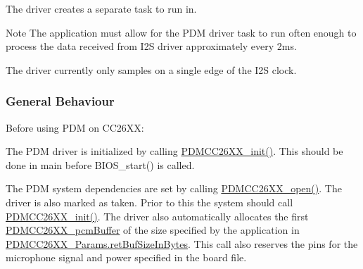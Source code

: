 The driver creates a separate task to run in.

\begin{DoxyNote}{Note}
The application must allow for the P\+D\+M driver task to run often enough to process the data received from I2\+S driver approximately every 2ms.
\end{DoxyNote}
The driver currently only samples on a single edge of the I2\+S clock.

\subsubsection*{General Behaviour}

Before using P\+D\+M on C\+C26\+X\+X\+:
\begin{DoxyItemize}
\item The P\+D\+M driver is initialized by calling \hyperlink{_p_d_m_c_c26_x_x_8h_a8347c3f56db0ad7c3f357f13be098cf2}{P\+D\+M\+C\+C26\+X\+X\+\_\+init()}. This should be done in main before B\+I\+O\+S\+\_\+start() is called.
\item The P\+D\+M system dependencies are set by calling \hyperlink{_p_d_m_c_c26_x_x_8h_a431d9b71e0d0eebd5ab85960f1c82ee0}{P\+D\+M\+C\+C26\+X\+X\+\_\+open()}. The driver is also marked as taken. Prior to this the system should call \hyperlink{_p_d_m_c_c26_x_x_8h_a8347c3f56db0ad7c3f357f13be098cf2}{P\+D\+M\+C\+C26\+X\+X\+\_\+init()}. The driver also automatically allocates the first \hyperlink{struct_p_d_m_c_c26_x_x__pcm_buffer}{P\+D\+M\+C\+C26\+X\+X\+\_\+pcm\+Buffer} of the size specified by the application in \hyperlink{struct_p_d_m_c_c26_x_x___params_a05bff0a3c2ddbb3a49c2bc7a47a7fe24}{P\+D\+M\+C\+C26\+X\+X\+\_\+\+Params.\+ret\+Buf\+Size\+In\+Bytes}. This call also reserves the pins for the microphone signal and power specified in the board file.
\end{DoxyItemize}

